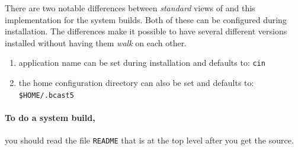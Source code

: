 There are two notable differences between \textit{standard} views of \CGG{} and this implementation for the system builds.  
Both of these can be configured during installation.  
The differences make it possible to have several different versions installed without having them \textit{walk} on each other. 

\begin{enumerate}
    \item 
        application name can be set during installation and defaults to: \texttt{cin}
    \item 
        the home configuration directory can also be set and defaults to:\\ \texttt{\$HOME/.bcast5}
\end{enumerate}

\paragraph{To do a system build,} you should read the file \texttt{README} that is at the top level after you get the source.


